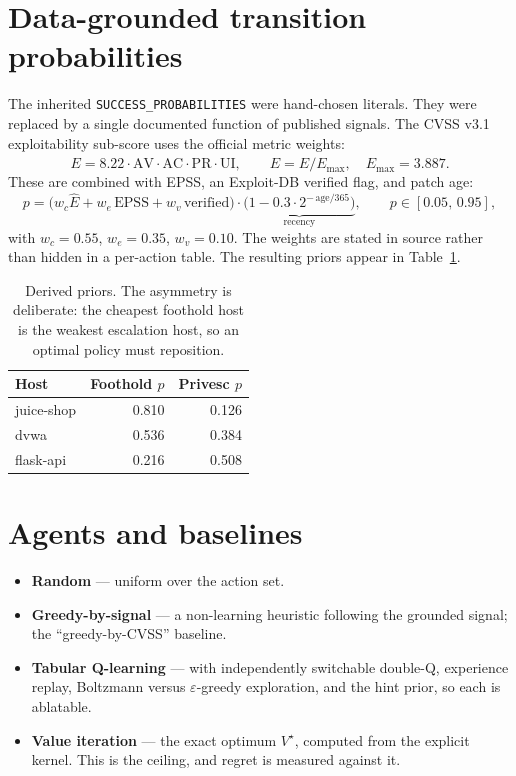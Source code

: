 \documentclass[11pt,a4paper]{report}
\newcommand{\code}[1]{\texttt{\small #1}}
\begin{document}
\section{Data-grounded transition probabilities}
\label{sec:grounding}
The inherited \code{SUCCESS\_PROBABILITIES} were hand-chosen literals. They were
replaced by a single documented function of published signals. The CVSS v3.1
exploitability sub-score uses the official metric weights:
\[
E = 8.22 \cdot \mathrm{AV} \cdot \mathrm{AC} \cdot \mathrm{PR} \cdot \mathrm{UI},
\qquad
\hat{E} = E / E_{\max},\quad E_{\max} = 3.887 .
\]
These are combined with EPSS, an Exploit-DB verified flag, and patch age:
\[
p = \big(w_{c}\hat{E} + w_{e}\,\mathrm{EPSS} + w_{v}\,\mathrm{verified}\big)
    \cdot \underbrace{\Big(1 - 0.3 \cdot 2^{-\,\text{age}/365}\Big)}_{\text{recency}},
\qquad p \in [0.05,\, 0.95],
\]
with $w_c = 0.55$, $w_e = 0.35$, $w_v = 0.10$. The weights are stated in source
rather than hidden in a per-action table. The resulting priors appear in
Table~\ref{tab:priors}.

\begin{table}[h]
\centering
\caption{Derived priors. The asymmetry is deliberate: the cheapest foothold host
is the weakest escalation host, so an optimal policy must reposition.}
\label{tab:priors}
\begin{tabular}{lrr}
\toprule
\textbf{Host} & \textbf{Foothold $p$} & \textbf{Privesc $p$}\\
\midrule
juice-shop & 0.810 & 0.126\\
dvwa       & 0.536 & 0.384\\
flask-api  & 0.216 & 0.508\\
\bottomrule
\end{tabular}
\end{table}

\section{Agents and baselines}
\begin{itemize}[leftmargin=*]
  \item \textbf{Random} --- uniform over the action set.
  \item \textbf{Greedy-by-signal} --- a non-learning heuristic following the
  grounded signal; the ``greedy-by-CVSS'' baseline.
  \item \textbf{Tabular Q-learning} --- with independently switchable double-Q,
  experience replay, Boltzmann versus $\varepsilon$-greedy exploration, and the
  hint prior, so each is ablatable.
  \item \textbf{Value iteration} --- the exact optimum $V^\star$, computed from
  the explicit kernel. This is the ceiling, and regret is measured against it.
\end{itemize}
\end{document}
